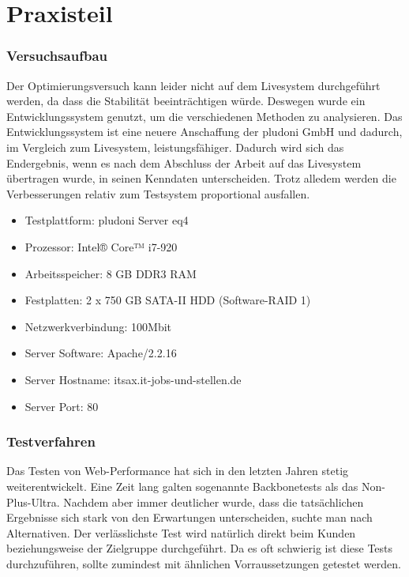 \part{Praxisteil}

\section{Versuchsaufbau}
Der Optimierungsversuch kann leider nicht auf dem Livesystem durchgeführt werden, da dass die Stabilität beeinträchtigen würde. Deswegen wurde ein Entwicklungssystem genutzt, um die verschiedenen Methoden zu analysieren. Das Entwicklungssystem ist eine neuere Anschaffung der pludoni GmbH und dadurch, im Vergleich zum Livesystem, leistungsfähiger. Dadurch wird sich das Endergebnis, wenn es nach dem Abschluss der Arbeit auf das Livesystem übertragen wurde, in seinen Kenndaten unterscheiden. Trotz alledem werden die Verbesserungen relativ zum Testsystem proportional ausfallen. 

\begin{itemize}
 \item Testplattform: pludoni Server eq4
  \item Prozessor: Intel® Core™ i7-920
  \item Arbeitsspeicher: 8 GB DDR3 RAM
  \item Festplatten: 2 x 750 GB SATA-II HDD (Software-RAID 1)
  \item Netzwerkverbindung: 100Mbit
  \item Server Software: Apache/2.2.16
  \item Server Hostname: itsax.it-jobs-und-stellen.de
  \item Server Port: 80
\end{itemize}

\section{Testverfahren}
Das Testen von Web-Performance hat sich in den letzten Jahren stetig weiterentwickelt. Eine Zeit lang galten sogenannte Backbonetests als das Non-Plus-Ultra. Nachdem aber immer deutlicher wurde, dass die tatsächlichen Ergebnisse sich stark von den Erwartungen unterscheiden, suchte man nach Alternativen. Der verlässlichste Test wird natürlich direkt beim Kunden beziehungsweise der Zielgruppe durchgeführt. Da es oft schwierig ist diese Tests durchzuführen, sollte zumindest mit ähnlichen Vorraussetzungen getestet werden.
